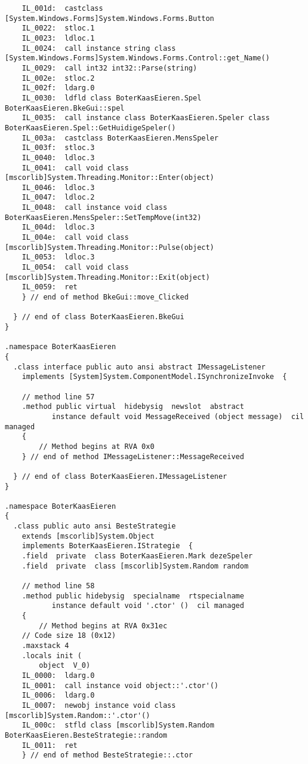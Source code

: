 \begin{lstlisting}
	IL_001d:  castclass [System.Windows.Forms]System.Windows.Forms.Button
	IL_0022:  stloc.1 
	IL_0023:  ldloc.1 
	IL_0024:  call instance string class [System.Windows.Forms]System.Windows.Forms.Control::get_Name()
	IL_0029:  call int32 int32::Parse(string)
	IL_002e:  stloc.2 
	IL_002f:  ldarg.0 
	IL_0030:  ldfld class BoterKaasEieren.Spel BoterKaasEieren.BkeGui::spel
	IL_0035:  call instance class BoterKaasEieren.Speler class BoterKaasEieren.Spel::GetHuidigeSpeler()
	IL_003a:  castclass BoterKaasEieren.MensSpeler
	IL_003f:  stloc.3 
	IL_0040:  ldloc.3 
	IL_0041:  call void class [mscorlib]System.Threading.Monitor::Enter(object)
	IL_0046:  ldloc.3 
	IL_0047:  ldloc.2 
	IL_0048:  call instance void class BoterKaasEieren.MensSpeler::SetTempMove(int32)
	IL_004d:  ldloc.3 
	IL_004e:  call void class [mscorlib]System.Threading.Monitor::Pulse(object)
	IL_0053:  ldloc.3 
	IL_0054:  call void class [mscorlib]System.Threading.Monitor::Exit(object)
	IL_0059:  ret 
    } // end of method BkeGui::move_Clicked

  } // end of class BoterKaasEieren.BkeGui
}

.namespace BoterKaasEieren
{
  .class interface public auto ansi abstract IMessageListener
  	implements [System]System.ComponentModel.ISynchronizeInvoke  {

    // method line 57
    .method public virtual  hidebysig  newslot  abstract 
           instance default void MessageReceived (object message)  cil managed 
    {
        // Method begins at RVA 0x0
    } // end of method IMessageListener::MessageReceived

  } // end of class BoterKaasEieren.IMessageListener
}

.namespace BoterKaasEieren
{
  .class public auto ansi BesteStrategie
  	extends [mscorlib]System.Object
  	implements BoterKaasEieren.IStrategie  {
    .field  private  class BoterKaasEieren.Mark dezeSpeler
    .field  private  class [mscorlib]System.Random random

    // method line 58
    .method public hidebysig  specialname  rtspecialname 
           instance default void '.ctor' ()  cil managed 
    {
        // Method begins at RVA 0x31ec
	// Code size 18 (0x12)
	.maxstack 4
	.locals init (
		object	V_0)
	IL_0000:  ldarg.0 
	IL_0001:  call instance void object::'.ctor'()
	IL_0006:  ldarg.0 
	IL_0007:  newobj instance void class [mscorlib]System.Random::'.ctor'()
	IL_000c:  stfld class [mscorlib]System.Random BoterKaasEieren.BesteStrategie::random
	IL_0011:  ret 
    } // end of method BesteStrategie::.ctor


\end{lstlisting}
